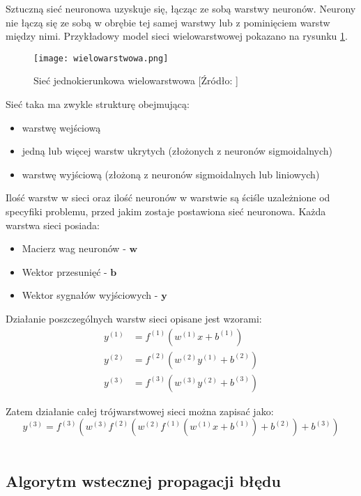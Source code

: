 \documentclass[12pt,twoside]{article}
\begin{document}
Sztuczną sieć neuronowa uzyskuje się, łącząc ze sobą warstwy neuronów. Neurony nie łączą się ze sobą w obrębie tej samej warstwy lub z pominięciem warstw między nimi. Przykładowy model sieci wielowarstwowej pokazano na rysunku \ref{wielo}.

\begin{figure}[h]
\label{wielo}
\centering
\texttt{[image: wielowarstwowa.png]}
\caption{Sieć jednokierunkowa wielowarstwowa	[Źródło: \cite{zajdel1}]}
\end{figure}

Sieć taka ma zwykle strukturę obejmującą: 
\begin{itemize}
\item warstwę wejściową
\item jedną lub więcej warstw ukrytych (złożonych z neuronów sigmoidalnych)
\item warstwę wyjściową (złożoną z neuronów sigmoidalnych lub liniowych)
\end{itemize}

 Ilość warstw w sieci oraz ilość neuronów w warstwie są ściśle uzależnione od specyfiki problemu, przed jakim zostaje postawiona sieć neuronowa.
\newpage
Każda warstwa sieci posiada:
\begin{itemize}
\item Macierz wag neuronów - $\textbf{w}$
\item Wektor przesunięć - $\textbf{b}$
\item Wektor sygnałów wyjściowych - $\textbf{y}$
\end{itemize}

Działanie poszczególnych warstw sieci opisane jest wzorami:
\begin{equation}\label{warstwy}
\begin{aligned}
y^{(1)} &= f^{(1)}(w^{(1)}x + b^{(1)})\\
y^{(2)} &= f^{(2)}(w^{(2)}y^{(1)} + b^{(2)})\\
y^{(3)} &= f^{(3)}(w^{(3)}y^{(2)} + b^{(3)})
\end{aligned}
\end{equation}

Zatem działanie całej trójwarstwowej sieci można zapisać jako:
\begin{equation}
y^{(3)} = f^{(3)}\left( w^{(3)} f^{(2)} \left( w^{(2)}f^{(1)} \left( w^{(1)}x + b^{(1)}\right) + b^{(2)} \right) + b^{(3)} \right)
\end{equation}
\\


\subsection{Algorytm wstecznej propagacji błędu}
\end{document}

